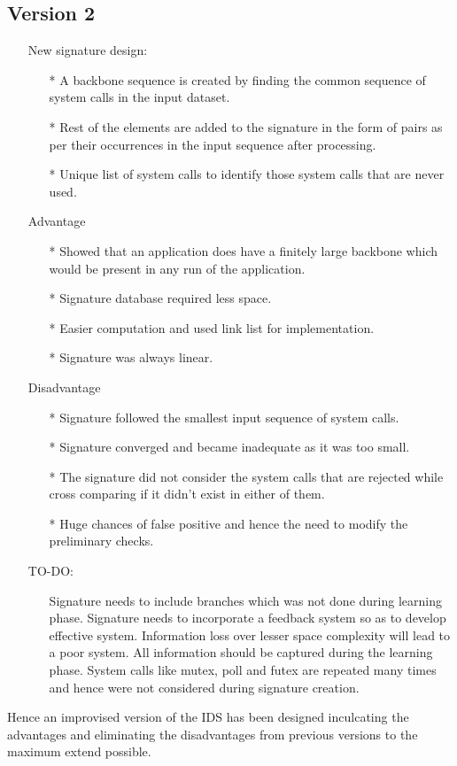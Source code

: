 \subsection{Version 2}
\begin{itemize}
    \item[] {New signature design:}
        \begin{itemize}
            \item[*] A backbone sequence is created by finding the common sequence of system calls in the input dataset.
            \item[*] Rest of the elements are added to the signature in the form of pairs as per their occurrences in the input sequence after processing.
            \item[*] Unique list of system calls to identify those system calls that are never used.
        \end{itemize}
\end{itemize}
\begin{itemize}
    \item[] {Advantage}
        \begin{itemize}
            \item[*] Showed that an application does have a finitely large backbone which would be present in any run of the application.
            \item[*] Signature database required less space.
            \item[*] Easier computation and used link list for implementation.
            \item[*] Signature was always linear.
        \end{itemize}
    \item[] {Disadvantage}
        \begin{itemize}
            \item[*] Signature followed the smallest input sequence of system calls.
            \item[*] Signature converged and became inadequate as it was too small.
            \item[*] The signature did not consider the system calls that are rejected while cross comparing if it didn't exist in either of them.
            \item[*] Huge chances of false positive and hence the need to modify the preliminary checks. \\
        \end{itemize}
    \item[] {TO-DO:}
        \begin{itemize}                                        
            \item[] Signature needs to include branches which was not done during learning phase. Signature needs to incorporate a feedback system so as to develop effective system. Information loss over lesser space complexity will lead to a poor system. All information should be captured during the learning phase. System calls like mutex, poll and futex are repeated many times and hence were not considered during signature creation.
        \end{itemize}
\end{itemize}
Hence an improvised version of the IDS has been designed inculcating the advantages and eliminating the disadvantages from previous versions to the maximum extend possible.
